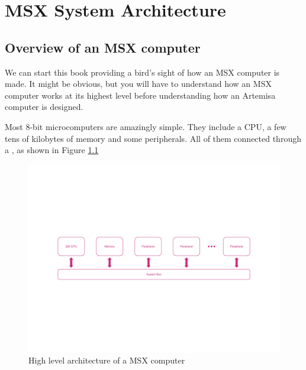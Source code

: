 \chapter{MSX System Architecture}

\section{Overview of an MSX computer}

We can start this book providing a bird’s sight of how an MSX computer is made. It might be obvious, but you will have to understand how an MSX computer works at its highest level before understanding how an Artemisa computer is designed.

Most 8-bit microcomputers are amazingly simple. They include a CPU, a few tens of kilobytes of memory and some peripherals. All of them connected through a , as shown in Figure \ref{fig:msx-arch-overview}

\begin{figure}
	\centering
	\includegraphics[width=\linewidth,trim={0cm 200 0 200},clip]{images/figures/msx-arch-overview}
	\caption{High level architecture of a MSX computer}
	\label{fig:msx-arch-overview}
\end{figure}


